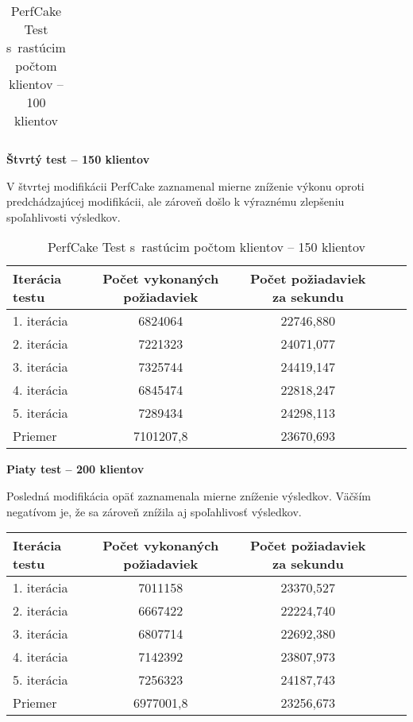 \documentclass[12pt,oneside,final]{fithesis-utf8}
\begin{document}
\begin{itemize}
\begin{table}[H]
\begin{center}
\begin{tabular}{ | l | c | c | c | c |}
\end{tabular}
\end{center}
\caption{PerfCake Test s~rastúcim počtom klientov -- 100 klientov}
\end{table}


\textbf{Štvrtý test -- 150 klientov}

V štvrtej modifikácii PerfCake zaznamenal mierne zníženie výkonu oproti predchádzajúcej modifikácii, ale zároveň došlo k výraznému zlepšeniu spoľahlivosti výsledkov.

\begin{table}[H]
\begin{center}
\begin{tabular}{ | l | c | c | c | c |}
		\hline
		 \textbf{Iterácia testu} & \textbf{Počet vykonaných požiadaviek} & \textbf{Počet požiadaviek za sekundu} \\ \hline
		 1. iterácia & 6824064 & 22746,880 \\ \hline
		 2. iterácia & 7221323 & 24071,077 \\ \hline
		 3. iterácia & 7325744 & 24419,147 \\ \hline
		 4. iterácia & 6845474 & 22818,247 \\ \hline
		 5. iterácia & 7289434 & 24298,113 \\ \hline
		 Priemer & 7101207,8 & 23670,693 \\ \hline
		 
\end{tabular}
\end{center}
\caption{PerfCake Test s~rastúcim počtom klientov -- 150 klientov}
\end{table}

\textbf{Piaty test -- 200 klientov}

Posledná modifikácia opäť zaznamenala mierne zníženie výsledkov. Väčším negatívom je, že sa zároveň znížila aj spoľahlivosť výsledkov.

\begin{table}[H]
\begin{center}
\begin{tabular}{ | l | c | c | c | c |}
		\hline
		 \textbf{Iterácia testu} & \textbf{Počet vykonaných požiadaviek} & \textbf{Počet požiadaviek za sekundu} \\ \hline
		 1. iterácia & 7011158 & 23370,527 \\ \hline
		 2. iterácia & 6667422 & 22224,740 \\ \hline
		 3. iterácia & 6807714 & 22692,380 \\ \hline
		 4. iterácia & 7142392 & 23807,973 \\ \hline
		 5. iterácia & 7256323 & 24187,743 \\ \hline
		 Priemer & 6977001,8 & 23256,673 \\ \hline
		 

\end{tabular}
\end{center}
\end{table}
\end{itemize}
\end{document}
